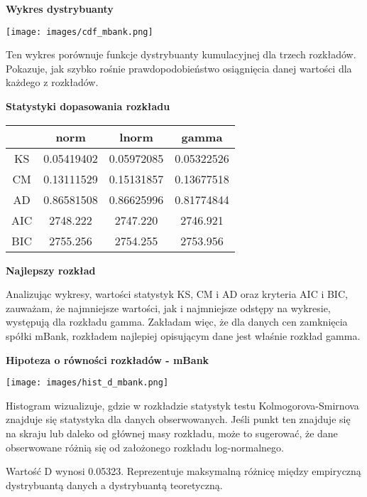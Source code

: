 \documentclass[12pt]{article}
\begin{document}
\vspace{1 cm}

{\bf \medium Wykres dystrybuanty}

\centerline{\texttt{[image: images/cdf\_mbank.png]}}
Ten wykres porównuje funkcje dystrybuanty kumulacyjnej dla trzech rozkładów. Pokazuje, jak szybko rośnie prawdopodobieństwo osiągnięcia danej wartości dla każdego z rozkładów.

{\bf \large Statystyki dopasowania rozkładu}

\begin{table}[h]
\centering
\begin{tabular}{|c|c|c|c|}
\hline
 & \textbf{norm} & \textbf{lnorm} & \textbf{gamma} \\
\hline
KS & 0.05419402 & 0.05972085 & 0.05322526 \\
CM & 0.13111529 & 0.15131857 & 0.13677518 \\
AD & 0.86581508 & 0.86625996 & 0.81774844 \\
\hline
AIC & 2748.222 & 2747.220 & 2746.921 \\
BIC & 2755.256 & 2754.255 & 2753.956 \\
\hline
\end{tabular}
\end{table}

{\bf \large Najlepszy rozkład}

Analizując wykresy, wartości statystyk KS, CM i AD oraz kryteria AIC i BIC, zauważam, że najmniejsze wartości, jak i najmniejsze odstępy na wykresie, występują dla rozkładu gamma.
Zakładam więc, że dla danych cen zamknięcia spółki mBank, rozkładem najlepiej opisującym dane jest właśnie rozkład gamma.

\clearpage

{\bf \large Hipoteza o równości rozkładów - mBank}
\vspace{0.5 cm}

\centerline{\texttt{[image: images/hist\_d\_mbank.png]}}
\par
Histogram wizualizuje, gdzie w rozkładzie statystyk testu Kolmogorova-Smirnova znajduje się statystyka dla danych obserwowanych. Jeśli punkt ten znajduje się na skraju lub daleko od głównej masy rozkładu, może to sugerować, że dane obserwowane różnią się od założonego rozkładu log-normalnego. 
\vspace{12pt}
\par
Wartość D wynosi 0.05323. Reprezentuje maksymalną różnicę między empiryczną dystrybuantą danych a dystrybuantą teoretyczną.
\vspace{12pt}
\end{document}
